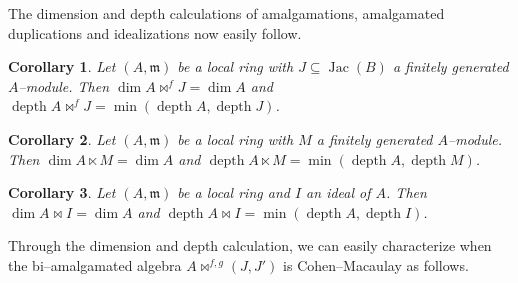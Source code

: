 \documentclass{amsart}%
\theoremstyle{plain}
\newtheorem{corollary}{Corollary}[section]
\numberwithin{equation}{section}
\theoremstyle{definition}
\DeclareMathOperator{\jac}{Jac}
\DeclareMathOperator{\depth}{depth}
\begin{document}
The dimension and depth calculations of amalgamations, amalgamated duplications and idealizations now easily follow.

\begin{corollary}
    Let $(A,\mathfrak{m})$ be a local ring with $J\subseteq \jac(B)$ a finitely generated $A$--module. Then $\dim A\bowtie^f J=\dim A$ and $\depth A\bowtie^f J=\min(\depth A,\depth J)$.
\end{corollary}

\begin{corollary}
    Let $(A,\mathfrak{m})$ be a local ring with $M$ a finitely generated $A$--module. Then $\dim A\ltimes M=\dim A$ and $\depth A\ltimes M=\min(\depth A,\depth M)$.
\end{corollary}

\begin{corollary}
    Let $(A,\mathfrak{m})$ be a local ring and $I$ an ideal of $A$.  Then $\dim A\bowtie I=\dim A$ and $\depth A\bowtie I=\min(\depth A,\depth I)$.
\end{corollary}

Through the dimension and depth calculation, we can easily characterize when the bi--amalgamated algebra $A\bowtie^{f,g}(J,J')$ is Cohen--Macaulay as follows.
\end{document}
